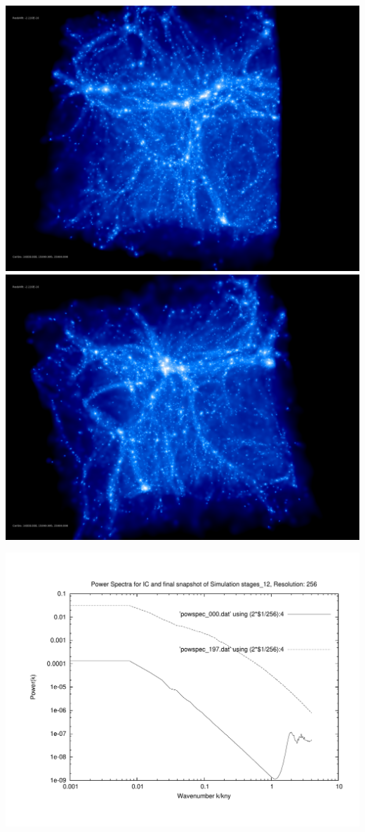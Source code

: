 \includegraphics[scale=0.1]{r256/h100/stages_12/rotate_00074.jpg} 
\includegraphics[scale=0.1]{r256/h100/stages_12/rotate_00131.jpg}

\includegraphics[scale=0.5]{r256/h100/stages_12/plot_powspec_stages_12}

